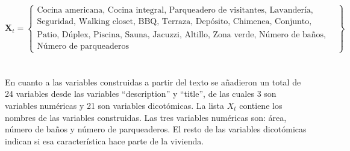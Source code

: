 \documentclass[article,11 pt]{article}
\begin{document}
\[
\mathbf{X}_t = \left\{
\begin{array}{l}
\text{Cocina americana, Cocina integral, Parqueadero de visitantes, Lavandería, Gimnasio, Balcón,} \\
\text{Seguridad, Walking closet, BBQ, Terraza, Depósito, Chimenea, Conjunto, Ascensor,} \\
\text{Patio, Dúplex, Piscina, Sauna, Jacuzzi, Altillo, Zona verde, Número de baños, Área,} \\
\text{Número de parqueaderos}
\end{array}
\right\}
\]
\\
\\
En cuanto a las variables construidas a partir del texto se añadieron un total de 24 variables desde las variables “description” y “title”, de las cuales 3 son variables numéricas y 21 son variables dicotómicas. La lista $X_t$ contiene los nombres de las variables construidas. Las tres variables numéricas son: área, número de baños y número de parqueaderos. El resto de las variables dicotómicas indican si esa característica hace parte de la vivienda.
\\
\\
\end{document}
